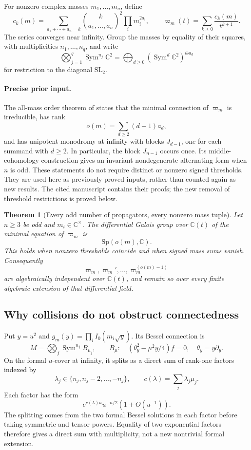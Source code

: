 \documentclass[11pt,a4paper]{article}
\newtheorem{theorem}{Theorem}[section]
\theoremstyle{definition}
\theoremstyle{remark}
\numberwithin{equation}{section}
\begin{document}
For nonzero complex masses $m_1,\ldots,m_n$, define
\[
 c_k(m)=\sum_{a_1+\cdots+a_n=k}
       \binom{k}{a_1,\ldots,a_n}^{\!2}\prod_i m_i^{2a_i},
 \qquad \varpi_m(t)=\sum_{k\ge0}\frac{c_k(m)}{t^{k+1}}.
\]
The series converges near infinity. Group the masses by equality of
their squares, with multiplicities $n_1,\ldots,n_q$, and write
\[
 \bigotimes_{j=1}^q\operatorname{Sym}^{n_j}\mathbb C^2
    =\bigoplus_{d\ge0}(\operatorname{Sym}^d\mathbb C^2)^{\oplus a_d}
\]
for restriction to the diagonal $\mathrm{SL}_2$.

\paragraph{Precise prior input.}
The all-mass order theorem of \cite{p5:Keio032} states that the minimal
connection of $\varpi_m$ is irreducible, has rank
\[
 o(m)=\sum_{d\ge2}(d-1)a_d,
\]
and has unipotent monodromy at infinity with blocks $J_{d-1}$,
one for each summand with $d\ge2$. In particular, the block $J_{n-1}$
occurs once. Its middle-cohomology construction gives an invariant
nondegenerate alternating form when $n$ is odd. These statements do
not require distinct or nonzero signed thresholds. They are used here
as previously proved inputs, rather than counted again as new results.
The cited manuscript contains their proofs; the new removal of threshold
restrictions is proved below.

\begin{theorem}[Every odd number of propagators, every nonzero mass tuple]
\label{p6:front:banana-main}
Let $n\ge3$ be odd and $m_i\in\mathbb C^\times$.
The differential Galois group over $\mathbb C(t)$ of the minimal
equation of $\varpi_m$ is
\[
                         \mathrm{Sp}(o(m),\mathbb C).
\]
This holds when nonzero thresholds coincide and when signed mass sums
vanish. Consequently
\[
 \varpi_m,\varpi_m',\ldots,\varpi_m^{(o(m)-1)}
\]
are algebraically independent over $\mathbb C(t)$, and remain so
over every finite algebraic extension of that differential field.
\end{theorem}

\subsection{Why collisions do not obstruct connectedness}

Put $y=u^2$ and
$g_m(y)=\prod_i I_0(m_i\sqrt y)$. Its Bessel connection is
\[
 M=\bigotimes_j\operatorname{Sym}^{n_j}B_{\mu_j},
 \qquad B_\mu:\quad (\theta_y^2-\mu^2y/4)f=0,
 \quad\theta_y=y\partial_y.
\]
On the formal $u$-cover at infinity, it splits as a direct sum of
rank-one factors indexed by
\[
 \lambda_j\in\{n_j,n_j-2,\ldots,-n_j\},\qquad
 c(\lambda)=\sum_j\lambda_j\mu_j.
\]
Each factor has the form
\[
          e^{c(\lambda)u}u^{-n/2}(1+O(u^{-1})).
\]
The splitting comes from the two formal Bessel solutions in each
factor before taking symmetric and tensor powers. Equality of two
exponential factors therefore gives a direct sum with multiplicity,
not a new nontrivial formal extension.
\end{document}
